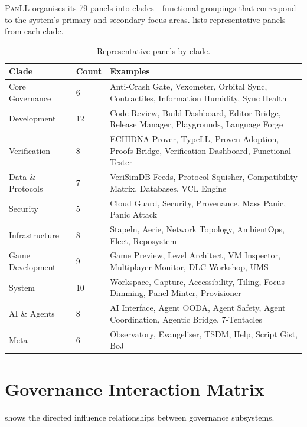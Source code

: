 \documentclass[11pt,a4paper]{article}
\newcommand{\panll}{\textsc{PanLL}}
\begin{document}
\panll{} organises its 79 panels into clades---functional groupings
that correspond to the system's primary and secondary focus areas.
 lists representative panels from each clade.

\begin{table}[h]
\centering
\caption{Representative panels by clade.}\label{tab:clades}
\small
\begin{tabular}{@{}llp{6cm}@{}}
\toprule
\textbf{Clade} & \textbf{Count} & \textbf{Examples} \\
\midrule
Core Governance & 6 & Anti-Crash Gate, Vexometer, Orbital Sync,
  Contractiles, Information Humidity, Sync Health \\
Development & 12 & Code Review, Build Dashboard, Editor Bridge,
  Release Manager, Playgrounds, Language Forge \\
Verification & 8 & ECHIDNA Prover, TypeLL, Proven Adoption,
  Proofs Bridge, Verification Dashboard,
  Functional Tester \\
Data \& Protocols & 7 & VeriSimDB Feeds, Protocol Squisher,
  Compatibility Matrix, Databases, VCL Engine \\
Security & 5 & Cloud Guard, Security, Provenance,
  Mass Panic, Panic Attack \\
Infrastructure & 8 & Stapeln, Aerie, Network Topology,
  AmbientOps, Fleet, Reposystem \\
Game Development & 9 & Game Preview, Level Architect, VM Inspector,
  Multiplayer Monitor, DLC Workshop, UMS \\
System & 10 & Workspace, Capture, Accessibility, Tiling,
  Focus Dimming, Panel Minter, Provisioner \\
AI \& Agents & 8 & AI Interface, Agent OODA, Agent Safety,
  Agent Coordination, Agentic Bridge, 7-Tentacles \\
Meta & 6 & Observatory, Evangeliser, TSDM, Help,
  Script Gist, BoJ \\
\bottomrule
\end{tabular}
\end{table}

\section{Governance Interaction Matrix}\label{app:governance-matrix}

 shows the directed influence relationships
between governance subsystems.
\end{document}
